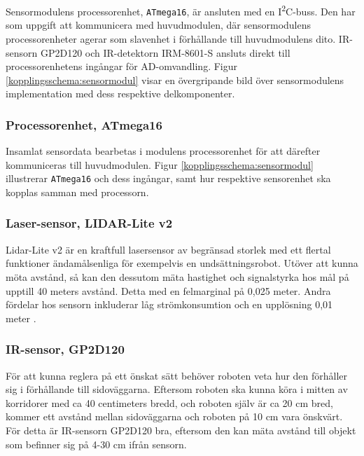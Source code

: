 \documentclass[11pt]{article}
\begin{document}
\begin{flushleft}
Sensormodulens processorenhet, \verb+ATmega16+, är ansluten med en I\textsuperscript{2}C-buss. Den har som uppgift att kommunicera med huvudmodulen, där sensormodulens processorenheter agerar som slavenhet i förhållande till huvudmodulens dito. 
IR-sensorn GP2D120 och IR-detektorn IRM-8601-S ansluts direkt till processorenhetens ingångar för AD-omvandling. Figur \ref{kopplingsschema:sensormodul} visar en övergripande bild över sensormodulens implementation med dess respektive delkomponenter. 

\subsubsection{Processorenhet, ATmega16}
Insamlat sensordata bearbetas i modulens processorenhet för att därefter kommuniceras till huvudmodulen. Figur \ref{kopplingsschema:sensormodul} illustrerar \verb+ATmega16+ och dess ingångar, samt hur respektive sensorenhet ska kopplas samman med processorn. 

\subsubsection{Laser-sensor, LIDAR-Lite v2}
Lidar-Lite v2 är en kraftfull lasersensor av begränsad storlek med ett flertal funktioner ändamålsenliga för exempelvis en undsättningsrobot. Utöver att kunna möta avstånd, så kan den dessutom mäta hastighet och signalstyrka hos mål på upptill 40 meters avstånd. Detta med en felmarginal på 0,025 meter. Andra fördelar hos sensorn inkluderar låg strömkonsumtion och en upplösning 0,01 meter \cite{7131685}.


\subsubsection{IR-sensor, GP2D120}
För att kunna reglera på ett önskat sätt behöver roboten veta hur den förhåller sig i förhållande till sidoväggarna. Eftersom roboten ska kunna köra i mitten av korridorer med ca 40 centimeters bredd, och roboten själv är ca 20 cm bred, kommer ett avstånd mellan sidoväggarna och roboten på 10 cm vara önskvärt. För detta är IR-sensorn GP2D120 bra, eftersom den kan mäta avstånd till objekt som befinner sig på 4-30 cm ifrån sensorn. 


\end{flushleft}
\end{document}
